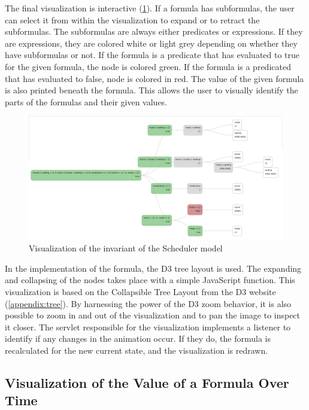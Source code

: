 The final visualization is interactive (\ref{predicate}). If a formula has subformulas, the user can select it from within the visualization to expand or to retract the subformulas. The subformulas are always either predicates or expressions. If they are expressions, they are colored white or light grey depending on whether they have subformulas or not. If the formula is a predicate that has evaluated to true for the given formula, the node is colored green. If the formula is a predicated that has evaluated to false, node is colored in red. The value of the given formula is also printed beneath the formula. This allows the user to visually identify the parts of the formulas and their given values. 

\begin{figure}[h!]
\centering
\includegraphics[width=15cm]{bilder/invariant.png}
\caption{Visualization of the invariant of the Scheduler model}
\label{predicate}
\end{figure}

In the implementation of the formula, the D3 tree layout is used. The expanding and collapsing of the nodes takes place with a simple JavaScript function. This visualization is based on the Collapsible Tree Layout from the D3 website (\ref{appendix:tree}). By harnessing the power of the D3 zoom behavior, it is also possible to zoom in and out of the visualization and to pan the image to inspect it closer. The servlet responsible for the visualization implements a listener to identify if any changes in the animation occur. If they do, the formula is recalculated for the new current state, and the visualization is redrawn.

\subsection{Visualization of the Value of a Formula Over Time}

